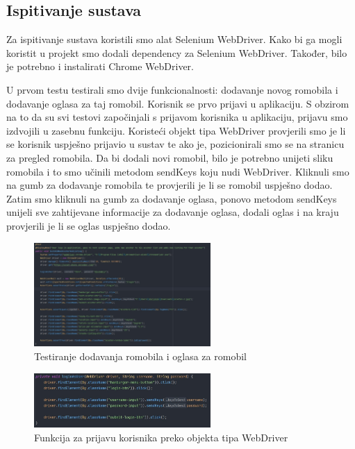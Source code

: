 			\subsection{Ispitivanje sustava}
			
			 Za ispitivanje sustava koristili smo alat Selenium WebDriver. Kako bi ga mogli koristit u projekt smo dodali  dependency za Selenium WebDriver. Također, bilo je potrebno i instalirati Chrome WebDriver.\newline
			 
			 \indent U prvom testu testirali smo dvije funkcionalnosti: dodavanje novog romobila i dodavanje oglasa za taj romobil. Korisnik se prvo prijavi u aplikaciju. S obzirom na to da su svi testovi započinjali s prijavom korisnika u aplikaciju, prijavu smo izdvojili u zasebnu funkciju. Koristeći objekt tipa WebDriver provjerili smo je li se korisnik uspješno prijavio u sustav te ako je, pozicionirali smo se na stranicu za pregled romobila. Da bi dodali novi romobil, bilo je potrebno unijeti sliku romobila i to smo učinili metodom sendKeys koju nudi WebDriver. Kliknuli smo na gumb za dodavanje romobila te provjerili je li se romobil uspješno dodao. Zatim smo kliknuli na gumb za dodavanje oglasa, ponovo metodom sendKeys unijeli sve zahtijevane informacije za dodavanje oglasa, dodali oglas i na kraju provjerili je li se oglas uspješno dodao. 
			 
			 \newpage
			 
			 \begin{figure}[h]
			 	\centering
			 	\includegraphics[width=0.6\textwidth]{slike/selenium_test_1.jpg}
			 	\caption{Testiranje dodavanja romobila i oglasa za romobil}
			 	\label{fig:Testiranje dodavanja romobila i oglasa za romobil}
			 \end{figure}
			 
			 \begin{figure}[h]
			 	\centering
			 	\includegraphics[width=0.6\textwidth]{slike/selenium_login.jpg}
			 	\caption{Funkcija za prijavu korisnika preko objekta tipa WebDriver}
			 	\label{fig:Funkcija za prijavu korisnika preko objekta tipa WebDriver}
			 \end{figure}
			 

